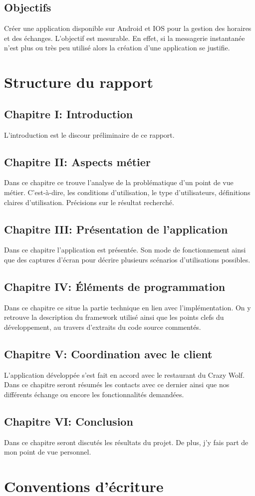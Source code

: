 \subsection*{Objectifs}

Créer une application disponible sur Android et IOS pour la gestion des horaires et des échanges. L'objectif est mesurable. En effet, si la messagerie instantanée n'est plus ou très peu utilisé alors la création d'une application se justifie.


\section[Structure du rapport]{Structure du rapport}

\subsection*{Chapitre I: Introduction}
L'introduction est le discour préliminaire de ce rapport.

\subsection*{Chapitre II: Aspects métier}
Dans ce chapitre ce trouve l'analyse de la problématique d'un point de vue métier. C'est-à-dire, les conditions d'utilisation, le type d'utilisateurs, définitions claires d'utilisation. Précisions sur le résultat recherché.

\subsection*{Chapitre III: Présentation de l'application}
Dans ce chapitre l'application est présentée. Son mode de fonctionnement ainsi que des captures d'écran pour décrire plusieurs scénarios d'utilisations possibles.

\subsection*{Chapitre IV: Éléments de programmation}
Dans ce chapitre ce situe la partie technique en lien avec l'implémentation. On y retrouve la description du framework utilisé ainsi que les points clefs du développement, au travers d'extraits du code source commentés.

\subsection*{Chapitre V: Coordination avec le client}
L'application développée s'est fait en accord avec le restaurant du Crazy Wolf. Dans ce chapitre seront résumés les contacts avec ce dernier ainsi que nos différents échange ou encore les fonctionnalités demandées.

\subsection*{Chapitre VI: Conclusion}
Dans ce chapitre seront discutés les résultats du projet. De plus, j'y fais part de mon point de vue personnel.

\section[Table des symboles]{Conventions d'écriture}

